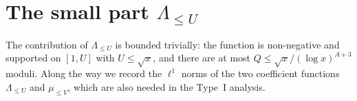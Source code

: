 \chapter{The small part \texorpdfstring{$\Lambda_{\le U}$}{Lambda le U}}\label{ch:small}

The contribution of $\Lambda_{\le U}$ is bounded trivially: the function is non-negative and supported
on $[1, U]$ with $U \le \sqrt x$, and there are at most $Q \le \sqrt x/(\log x)^{A+3}$ moduli. Along the
way we record the $\ell^1$ norms of the two coefficient functions $\Lambda_{\le U}$ and $\mu_{\le V}$, which
are also needed in the Type~I analysis.




